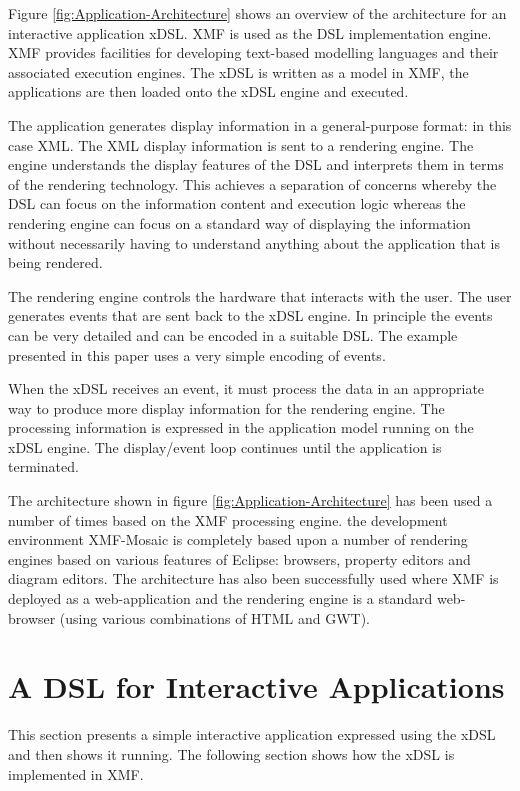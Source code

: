 Figure \ref{fig:Application-Architecture} shows an overview of the
architecture for an interactive application xDSL. XMF is used as the
DSL implementation engine. XMF provides facilities for developing
text-based modelling languages and their associated execution engines.
The xDSL is written as a model in XMF, the applications are then loaded
onto the xDSL engine and executed.

The application generates display information in a general-purpose
format: in this case XML. The XML display information is sent to a
rendering engine. The engine understands the display features of the
DSL and interprets them in terms of the rendering technology. This
achieves a separation of concerns whereby the DSL can focus on the
information content and execution logic whereas the rendering engine
can focus on a standard way of displaying the information without
necessarily having to understand anything about the application that
is being rendered.

The rendering engine controls the hardware that interacts with the
user. The user generates events that are sent back to the xDSL engine.
In principle the events can be very detailed and can be encoded in
a suitable DSL. The example presented in this paper uses a very simple
encoding of events.

When the xDSL receives an event, it must process the data in an appropriate
way to produce more display information for the rendering engine.
The processing information is expressed in the application model running
on the xDSL engine. The display/event loop continues until the application
is terminated.

The architecture shown in figure \ref{fig:Application-Architecture}
has been used a number of times based on the XMF processing engine.
the development environment XMF-Mosaic is completely based upon a
number of rendering engines based on various features of Eclipse:
browsers, property editors and diagram editors. The architecture has
also been successfully used where XMF is deployed as a web-application
and the rendering engine is a standard web-browser (using various
combinations of HTML and GWT).


\section{A DSL for Interactive Applications\label{sec:A-DSL-for-Interactive-Applications}}

This section presents a simple interactive application expressed using
the xDSL and then shows it running. The following section shows how
the xDSL is implemented in XMF.

